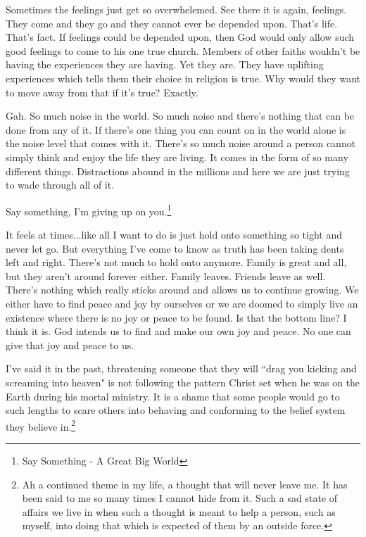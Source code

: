 Sometimes the feelings just get so overwhelemed. See there it is again,
feelings. They come and they go and they cannot ever be depended upon. That's
life. That's fact. If feelings could be depended upon, then God would only allow
such good feelings to come to his one true church. Members of other faiths
wouldn't be having the experiences they are having. Yet they are. They have
uplifting experiences which tells them their choice in religion is true. Why
would they want to move away from that if it's true? Exactly.

Gah. So much noise in the world. So much noise and there's nothing that can be
done from any of it. If there's one thing you can count on in the world alone is
the noise level that comes with it. There's so much noise around a person cannot
simply think and enjoy the life they are living. It comes in the form of so many
different things. Distractions abound in the millions and here we are just
trying to wade through all of it.

\begin{displayquote}
\centering
Say something, I'm giving up on you.\footnote{Say Something - A Great Big World}
\end{displayquote}

It feels at times...like all I want to do is just hold onto something so tight
and never let go. But everything I've come to know as truth has been taking
dents left and right. There's not much to hold onto anymore. Family is great and
all, but they aren't around forever either. Family leaves. Friends leave as
well. There's nothing which really sticks around and allows us to continue
growing. We either have to find peace and joy by ourselves or we are doomed to
simply live an existence where there is no joy or peace to be found. Is that the
bottom line? I think it is. God intends us to find and make our own joy and
peace. No one can give that joy and peace to us.

I've said it in the past, threatening someone that they will ``drag you kicking
and screaming into heaven" is not following the pattern Christ set when he was
on the Earth during his mortal ministry. It is a shame that some people would go
to such lengths to scare others into behaving and conforming to the belief
system they believe in.\footnote{Ah a continued theme in my life, a thought that
will never leave me. It has been said to me so many times I cannot hide from it.
Such a sad state of affairs we live in when such a thought is meant to help a
person, such as myself, into doing that which is expected of them by an outside
force.}

